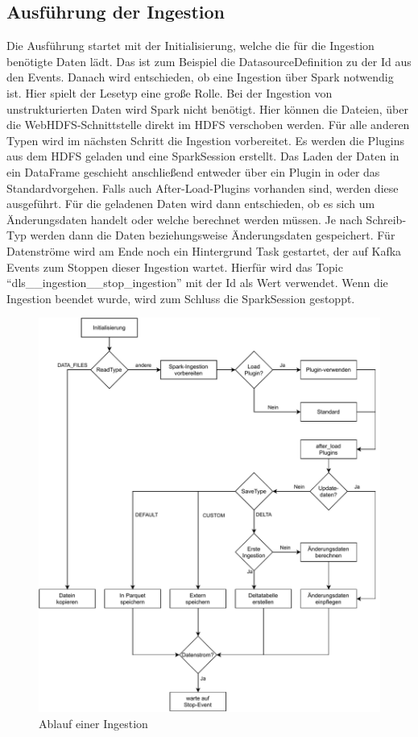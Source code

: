\subsection{Ausführung der Ingestion}
\label{sec:ingestion-run}
Die Ausführung startet mit der Initialisierung, welche die für die Ingestion benötigte Daten lädt.
Das ist zum Beispiel die DatasourceDefinition zu der Id aus den Events.
Danach wird entschieden, ob eine Ingestion über Spark notwendig ist.
Hier spielt der Lesetyp eine große Rolle.
Bei der Ingestion von unstrukturierten Daten wird Spark nicht benötigt.
Hier können die Dateien, über die WebHDFS-Schnittstelle direkt im HDFS verschoben werden.
Für alle anderen Typen wird im nächsten Schritt die Ingestion vorbereitet.
Es werden die Plugins aus dem HDFS geladen und eine SparkSession erstellt.
Das Laden der Daten in ein DataFrame geschieht anschließend entweder über ein Plugin in oder das Standardvorgehen.
Falls auch After-Load-Plugins vorhanden sind, werden diese ausgeführt.
Für die geladenen Daten wird dann entschieden, ob es sich um Änderungsdaten handelt oder welche berechnet werden müssen.
Je nach Schreib-Typ werden dann die Daten beziehungsweise Änderungsdaten gespeichert.
Für Datenströme wird am Ende noch ein Hintergrund Task gestartet, der auf Kafka Events zum Stoppen dieser Ingestion wartet.
Hierfür wird das Topic "`dls\_\_ingestion\_\_stop\_ingestion"' mit der Id als Wert verwendet.
Wenn die Ingestion beendet wurde, wird zum Schluss die SparkSession gestoppt.

\begin{figure}
    \centering
    \includegraphics[width=\textwidth]{Grafiken/Umsetzung-Ingestion-Ablauf.pdf}
    \caption{Ablauf einer Ingestion}
    \label{fig:umsetz-ingestion-ablauf}
\end{figure}